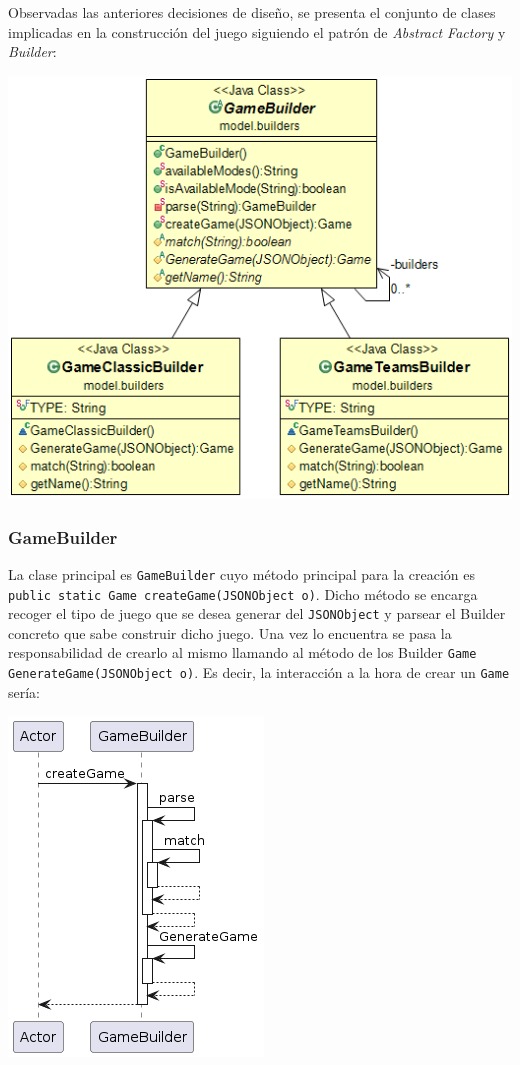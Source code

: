 \documentclass[../DocumentoOficial.tex]{subfiles}
\begin{document}
Observadas las anteriores decisiones de diseño, se presenta el conjunto de clases implicadas en la construcción del juego siguiendo el patrón de \textit{Abstract Factory} y \textit{Builder}:

\begin{center}
\includegraphics[scale=0.7]{Builders_final_class.png}
\end{center}

\subsubsection{GameBuilder}
La clase principal es \texttt{GameBuilder} cuyo método principal para la creación es \texttt{public static Game createGame(JSONObject o)}. Dicho método se encarga recoger el tipo de juego que se desea generar del \texttt{JSONObject} y parsear el Builder concreto que sabe construir dicho juego. Una vez lo encuentra se pasa la responsabilidad de crearlo al mismo llamando al método de los Builder \texttt{Game GenerateGame(JSONObject o)}. Es decir, la interacción a la hora de crear un \texttt{Game} sería:
\begin{center}
\includegraphics[scale=0.55]{Builders_final_seq}
\end{center}
\end{document}
